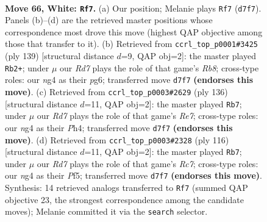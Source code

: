\documentclass[11pt]{article}
\begin{document}
\clearpage

\begin{figure}[p]\centering
\begin{subfigure}{0.46\textwidth}\centering
\resizebox{\linewidth}{!}{%
\newchessgame
\chessboard[
  setfen={7k/3R4/1P6/8/P5n1/1K6/7r/8 w - - 5 66},
  showmover=false,
  pgfstyle=straightmove, color=movearrow, markmove={d7-f7}
]}
\caption{}
\end{subfigure}\hfill
\begin{subfigure}{0.46\textwidth}\centering
\resizebox{\linewidth}{!}{%
\newchessgame
\chessboard[
  setfen={7R/8/6P1/8/8/4kp2/7K/1r6 b - - 8 70},
  showmover=false,
  pgfstyle=straightmove, color=movearrow, markmove={b1-b2}
]}
\caption{}
\end{subfigure}
\\[4pt]
\begin{subfigure}{0.46\textwidth}\centering
\resizebox{\linewidth}{!}{%
\newchessgame
\chessboard[
  setfen={6k1/4R3/8/5P1K/7P/8/6r1/8 w - - 3 69},
  showmover=false,
  pgfstyle=straightmove, color=movearrow, markmove={e7-b7}
]}
\caption{}
\end{subfigure}\hfill
\begin{subfigure}{0.46\textwidth}\centering
\resizebox{\linewidth}{!}{%
\newchessgame
\chessboard[
  setfen={6k1/2R5/5K2/5P2/p7/6r1/8/8 w - - 1 59},
  showmover=false,
  pgfstyle=straightmove, color=movearrow, markmove={c7-b7}
]}
\caption{}
\end{subfigure}
\caption{\textbf{Move 66, White: \texttt{Rf7}.} (a) Our position; Melanie plays \texttt{Rf7} (\texttt{d7f7}). Panels (b)--(d) are the retrieved master positions whose correspondence most drove this move (highest QAP objective among those that transfer to it). (b) Retrieved from \texttt{ccrl\_top\_p0001\#3425} (ply 139) [structural distance $d$=9, QAP obj=2]: the master played \texttt{Rb2+}; under $\mu$ our \emph{Rd7} plays the role of that game's \emph{Rb8}; cross-type roles: our \emph{n}g4 as their \emph{p}g6; transferred move \texttt{d7f7} \textbf{(endorses this move)}. (c) Retrieved from \texttt{ccrl\_top\_p0003\#2629} (ply 136) [structural distance $d$=11, QAP obj=2]: the master played \texttt{Rb7}; under $\mu$ our \emph{Rd7} plays the role of that game's \emph{Re7}; cross-type roles: our \emph{n}g4 as their \emph{P}h4; transferred move \texttt{d7f7} \textbf{(endorses this move)}. (d) Retrieved from \texttt{ccrl\_top\_p0003\#2328} (ply 116) [structural distance $d$=11, QAP obj=2]: the master played \texttt{Rb7}; under $\mu$ our \emph{Rd7} plays the role of that game's \emph{Rc7}; cross-type roles: our \emph{n}g4 as their \emph{P}f5; transferred move \texttt{d7f7} \textbf{(endorses this move)}. Synthesis: 14 retrieved analogs transferred to \texttt{Rf7} (summed QAP objective 23, the strongest correspondence among the candidate moves); Melanie committed it via the \texttt{search} selector.}
\label{fig:thought-m130}
\end{figure}
\end{document}
